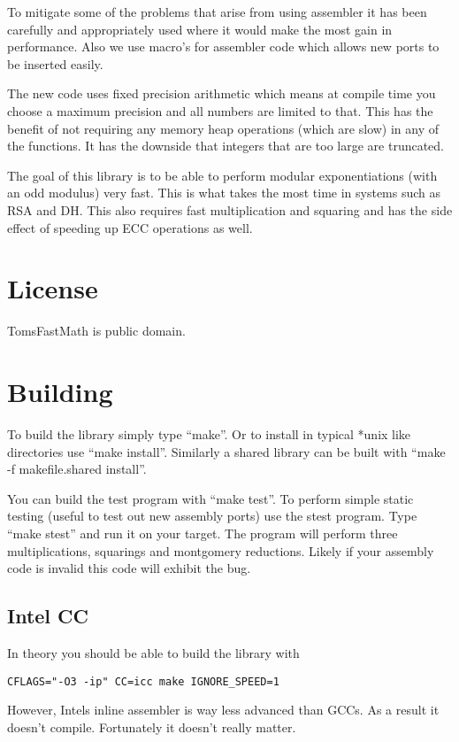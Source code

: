 \documentclass[b5paper]{book}
\begin{document}
To mitigate some of the problems that arise from using assembler it has been carefully and 
appropriately used where it would make the most gain in performance.  Also we use macro's
for assembler code which allows new ports to be inserted easily.

The new code uses fixed precision arithmetic which means at compile time you choose a maximum 
precision and all numbers are limited to that.  This has the benefit of not requiring any
memory heap operations (which are slow) in any of the functions.  It has the downside that 
integers that are too large are truncated.

The goal of this library is to be able to perform modular exponentiations (with an odd modulus) very
fast.  This is what takes the most time in systems such as RSA and DH.  This also requires
fast multiplication and squaring and has the side effect of speeding up ECC operations as well.

\section{License}
TomsFastMath is public domain.

\section{Building}
To build the library simply type ``make''.  Or to install in typical *unix like directories use
``make install''.  Similarly a shared library can be built with ``make -f makefile.shared install''.

You can build the test program with ``make test''.  To perform simple static testing (useful to 
test out new assembly ports) use the stest program.  Type ``make stest'' and run it on your 
target.  The program will perform three multiplications, squarings and montgomery reductions.  
Likely if your assembly code is invalid this code will exhibit the bug.

\subsection{Intel CC}
In theory you should be able to build the library with

\begin{verbatim}
CFLAGS="-O3 -ip" CC=icc make IGNORE_SPEED=1
\end{verbatim}

However, Intels inline assembler is way less advanced than GCCs.  As a result it doesn't compile.  
Fortunately it doesn't really matter.
\end{document}
